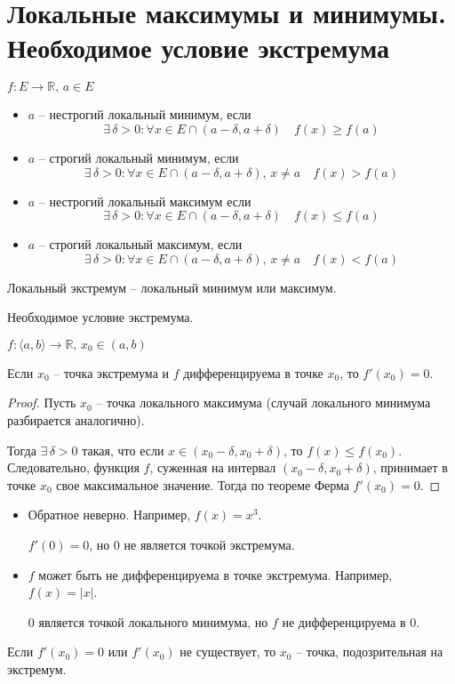 \section{Локальные максимумы и минимумы. Необходимое условие экстремума \href{https://youtu.be/CAxh8kYEOlQ?t=45}{\Walley}}
\begin{conj}
    $f: E \to \mathbb{R}, \, a \in E$
    \begin{itemize}
        \item $a$ -- нестрогий локальный минимум, если
        \[ \exists \, \delta > 0 : \forall x \in E \cap (a - \delta, a + \delta) \quad f(x) \geqslant f(a) \]
        \item $a$ -- строгий локальный минимум, если
        \[ \exists \, \delta > 0 : \forall x \in E \cap (a - \delta, a + \delta), \, x \neq a \quad f(x) > f(a) \]
        \item $a$ -- нестрогий локальный максимум если
        \[ \exists \, \delta > 0 : \forall x \in E \cap (a - \delta, a + \delta) \quad f(x) \leqslant f(a) \]
        \item $a$ -- строгий локальный максимум, если
        \[ \exists \, \delta > 0 : \forall x \in E \cap (a - \delta, a + \delta), \, x \neq a \quad f(x) < f(a) \]
    \end{itemize}
    Локальный экстремум -- локальный минимум или максимум.
\end{conj}

\begin{theorem-non}
    Необходимое условие экстремума.

    $f: \langle a, b \rangle \to \mathbb{R}, \, x_0 \in (a, b)$

    Если $x_0$ -- точка экстремума и $f$ дифференцируема в точке $x_0$, то $f'(x_0) = 0$.
\end{theorem-non}

\begin{proof}
    Пусть $x_0$ -- точка локального максимума (случай локального минимума разбирается аналогично).

    Тогда $\exists \, \delta > 0$ такая, что если $x \in (x_0 - \delta, x_0 + \delta)$, то $f(x) \leqslant f(x_0)$.
    Следовательно, функция $f$, суженная на интервал $(x_0 - \delta, x_0 + \delta)$, принимает в точке $x_0$ свое максимальное значение. 
    Тогда по теореме Ферма $f'(x_0) = 0$. 
\end{proof}

\begin{notice}
    \begin{itemize}
        \item Обратное неверно. 
        Например, $f(x) = x^3$.
    
        $f'(0) = 0$, но 0 не является точкой экстремума.
        \item $f$ может быть не дифференцируема в точке экстремума.
        Например, $f(x) = |x|$.

        0 является точкой локального минимума, но $f$ не дифференцируема в 0.
    \end{itemize}
\end{notice}

Если $f'(x_0) = 0$ или $f'(x_0)$ не существует, то $x_0$ -- точка, подозрительная на экстремум.
